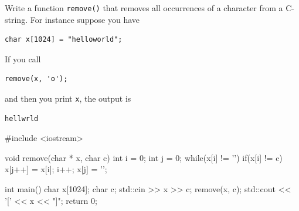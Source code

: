 \newpage
\nextq
Write a function \verb!remove()! that removes all occurrences of a
character from a C-string.
For instance suppose you have
\vspace{-2mm}
\begin{Verbatim}[frame=single,fontsize=\small]
char x[1024] = "helloworld";
\end{Verbatim}
\vspace{-5mm}
If you call
\vspace{-3mm}
\begin{Verbatim}[frame=single,fontsize=\small]
remove(x, 'o');
\end{Verbatim}
\vspace{-4mm}
and then you print \verb!x!, the output is
\vspace{-3mm}
\begin{Verbatim}[frame=single,fontsize=\small]
hellwrld
\end{Verbatim}
\ANSWER
\begin{answercode}
#include <iostream>

void remove(char * x, char c)
{
  int i = 0;
  int j = 0;
  while(x[i] != '\0')
  {
    if(x[i] != c)
      x[j++] = x[i];
    i++;
  }
  x[j] = '\0';
}

int main()
{
    char x[1024];
    char c;
    std::cin >> x >> c;
    remove(x, c);
    std::cout << '[' << x << "]\n";
    return 0;
}
\end{answercode}


